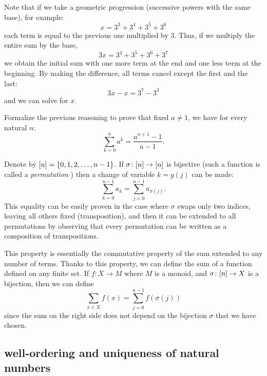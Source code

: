 \begin{exercise}
  \label{ex:somma_geometrica}%
Note that if we take a geometric progression 
(successive powers with the same base), 
for example:
\[
  x = 3^3 + 3^4 + 3^5 + 3^6
\]
each term is equal to the previous one multiplied by $3$.
Thus, if we multiply the entire sum by the base,
\[
  3x = 3^4 + 3^5 + 3^6 + 3^7
\]
we obtain the initial sum with one more term at the end 
and one less term at the beginning. 
By making the difference, all terms cancel except 
the first and the last:
\[
 3x - x = 3^7 - 3^3  
\]
and we can solve for $x$.

Formalize the previous reasoning to prove that 
fixed $a\neq 1$, we have for every natural $n$:
  \[
    \sum_{k=0}^n a^k = \frac{a^{n+1}-1}{a-1}.
  \] 
\end{exercise}

Denote by ${\left[ n \right]} = {\left\{ 0,1,2, \dots, n-1 \right\}}$.
If $\sigma\colon {\left[ n \right]} \to {\left[ n \right]}$
is bijective (such a function is called a \emph{permutation}%
%
)
then a change of variable $k=g(j)$ can be made:
\[
    \sum_{k=0}^{n-1} a_k = \sum_{j=0}^{n-1} a_{\sigma(j)}.
\]
This equality can be easily proven in the case 
where $\sigma$ swaps only two indices, leaving all others fixed 
(transposition), and then it can be extended to all permutations
by observing that every permutation can be written as a composition 
of transpositions.

This property is essentially the commutative property of the sum 
extended to any number of terms.
Thanks to this property, we can define the sum of a function 
defined on any finite set. 
If $f\colon X \to M$
where $M$ is a monoid, 
and $\sigma\colon {\left[ n \right]} \to X$ is a bijection,
then we can define 
\[
  \sum_{x\in X} f(x) = \sum_{j=0}^{n-1} f(\sigma(j))  
\]
since the sum on the right side does not depend on the bijection $\sigma$ that 
we have chosen.


\subsection{well-ordering and uniqueness of natural numbers}

